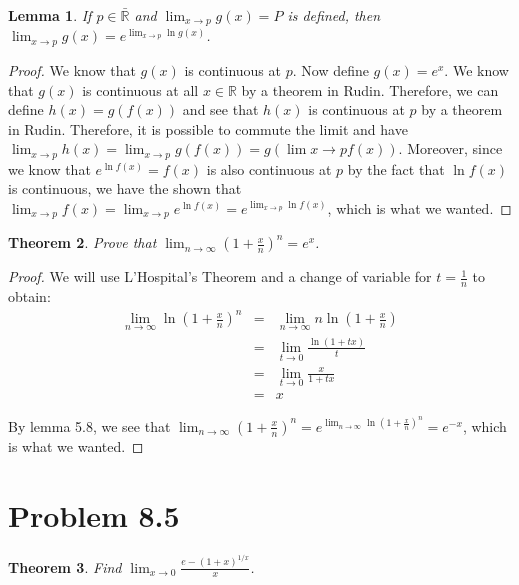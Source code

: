 \documentclass[psamsfonts]{amsart}
\newtheorem{thm}{Theorem}[section]
\newtheorem{lem}[thm]{Lemma}
\theoremstyle{definition}
\theoremstyle{remark}
\numberwithin{equation}{section}
\begin{document}
\begin{lem}
If $p \in \bar{\mathbb{R}}$ and $\lim_{x \to p} g(x) = P$ is defined, then $\lim_{x \to p} g(x) = e^{\lim_{x \to p} \ln g(x)}$. 
\end{lem}

\begin{proof}
We know that $g(x)$ is continuous at $p$. Now define $g(x) = e^x$. We know that $g(x)$ is continuous at all $x \in \mathbb{R}$ by a theorem in Rudin. Therefore, we can define $h(x) = g(f(x))$ and see that $h(x)$ is continuous at $p$ by a theorem in Rudin. Therefore, it is possible to commute the limit and have $\lim_{x \to p} h(x) = \lim_{x \to p} g(f(x)) = g(\lim{x \to p} f(x))$. Moreover, since we know that $e^{\ln f(x)} = f(x)$ is also continuous at $p$ by the fact that $\ln f(x)$ is continuous, we have the shown that $\lim_{x \to p} f(x) = \lim_{x \to p} e^{\ln f(x)} = e^{ \lim_{x \to p} \ln f(x)}$, which is what we wanted. 
\end{proof}

\begin{thm}
Prove that $\lim_{n \to \infty} (1+ \frac{x}{n})^n = e^x$.
\end{thm}

\begin{proof}
We will use L'Hospital's Theorem and a change of variable for $t = \frac{1}{n}$ to obtain:
\begin{eqnarray}
{\lim_{n \to \infty} \ln \left(1+ \frac{x}{n} \right)^n} &=& {\lim_{n \to \infty} n \ln \left(1+ \frac{x}{n} \right)} \\
&=& \lim_{t \to 0} \frac{ \ln(1 + t x)}{t} \\
&=& \lim_{t \to 0} \frac{x}{1+tx} \\
&=& x
\end{eqnarray}

By lemma 5.8, we see that $\lim_{n \to \infty} (1+ \frac{x}{n})^n = e^{\lim_{n \to \infty} \ln(1 + \frac{x}{n})^n} = e^{-x}$, which is what we wanted. 
\end{proof}

\section{Problem 8.5}

\begin{thm}
Find $\lim_{x \to 0} \frac{ e - (1+x)^{1/x}}{x}$.
\end{thm}
\end{document}
